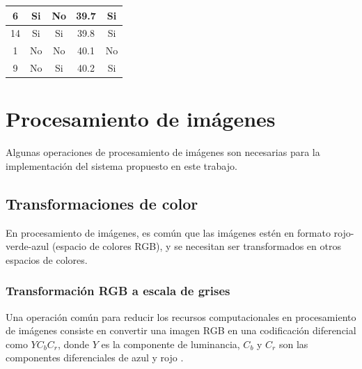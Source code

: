 \documentclass[twoside,spanish,ESP,MSc]{plantillaLabUPV}
\theoremstyle{definition}
\begin{document}
\begin{table}[!tbh]
\begin{tabular}{|c|c|c|c|c|}
		6           & Si           & No                                                                     & 39.7              & Si             \\ \hline
		14          & Si           & Si                                                                     & 39.8              & Si             \\ \hline
		1           & No           & No                                                                     & 40.1              & No             \\ \hline
		9           & No           & Si                                                                     & 40.2              & Si             \\ \hline

	\end{tabular}
\end{table}





\section{Procesamiento de imágenes}
Algunas operaciones de procesamiento de imágenes son necesarias para la implementación del sistema propuesto en este trabajo. 


\subsection{Transformaciones de color}

En procesamiento de imágenes, es común que las imágenes estén en formato rojo-verde-azul (espacio de colores RGB), y se necesitan ser transformados en otros espacios de colores. 

\subsubsection{Transformación RGB a escala de grises}

Una operación común para reducir los recursos computacionales en procesamiento de imágenes consiste en convertir una imagen RGB en una codificación diferencial como $YC_bC_r$, donde $Y$ es la componente de luminancia, $C_b$ y $C_r$ son las componentes diferenciales de azul y rojo \cite{Book_IVSS}.
\end{document}
